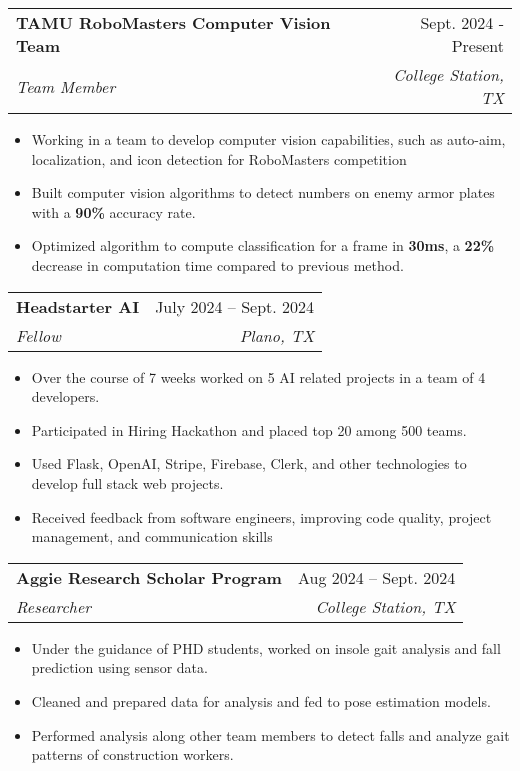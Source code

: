 \documentclass[letterpaper,11pt]{article}
\makeatletter
\newcommand{\resumeItem}[1]{
  \item\small{
    {#1 \vspace{-2pt}}
  }
}
\newcommand{\resumeSubheading}[4]{
  \vspace{-2pt}\item
    \begin{tabular*}{0.97\textwidth}[t]{l@{\extracolsep{\fill}}r}
      \textbf{#1} & #2 \\
      \textit{\small#3} & \textit{\small #4} \\
    \end{tabular*}\vspace{-7pt}
}
\newcommand{\resumeSubSubheading}[2]{
    \item
    \begin{tabular*}{0.97\textwidth}{l@{\extracolsep{\fill}}r}
      \textit{\small#1} & \textit{\small #2} \\
    \end{tabular*}\vspace{-7pt}
}
\newcommand{\resumeSubHeadingListEnd}{\end{itemize}}
\newcommand{\resumeItemListStart}{\begin{itemize}}
\newcommand{\resumeItemListEnd}{\end{itemize}\vspace{-5pt}}
\makeatother
\begin{document}
  \resumeSubheading
      {TAMU RoboMasters Computer Vision Team}{Sept. 2024 - Present}
      {Team Member}{College Station, TX}
      \resumeItemListStart
        \resumeItem{Working in a team to develop computer vision capabilities, such as auto-aim, localization, and icon detection for RoboMasters competition}
        \resumeItem{Built computer vision algorithms to detect numbers on enemy armor plates with a \textbf{90\%} accuracy rate.}
        \resumeItem{Optimized algorithm to compute classification for a frame in \textbf{30ms}, a \textbf{22\%} decrease in computation time compared to previous method.}
      \resumeItemListEnd

    \resumeSubheading
      {Headstarter AI}{July 2024 -- Sept. 2024}
      {Fellow}{Plano, TX}
      \resumeItemListStart
        \resumeItem{Over the course of 7 weeks worked on 5 AI related projects in a team of 4 developers.}
        \resumeItem{Participated in Hiring Hackathon and placed top 20 among 500 teams.}
        \resumeItem{Used Flask, OpenAI, Stripe, Firebase, Clerk, and other technologies to develop full stack web projects.}
        \resumeItem{Received feedback from software engineers, improving code quality, project management, and communication skills}
      \resumeItemListEnd


      \resumeSubheading
      {Aggie Research Scholar Program}{Aug 2024 -- Sept. 2024}
      {Researcher}{College Station, TX}
      \resumeItemListStart
        \resumeItem{Under the guidance of PHD students, worked on insole gait analysis and fall prediction using sensor data.}
        \resumeItem{Cleaned and prepared data for analysis and fed to pose estimation models.}
        \resumeItem{Performed analysis along other team members to detect falls and analyze gait patterns of construction workers.}
      \resumeItemListEnd

      
\end{document}
